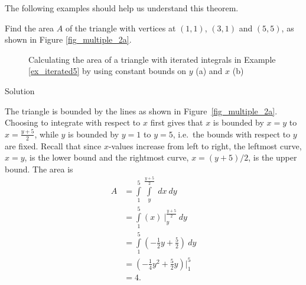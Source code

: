 The following examples should help us understand this theorem.


\begin{example}\label{ex_iterated5}
Find the area $A$ of the triangle with vertices at $(1,1)$, $(3,1)$ and $(5,5)$, as shown in Figure \ref{fig_multiple_2a}.



\begin{figure}[H]
\centering
\qquad
{}
\caption{Calculating the area of a triangle with iterated integrals in Example \ref{ex_iterated5} by using constant bounds on $y$ (a) and $x$ (b) }
\end{figure}




Solution 

The triangle is bounded by the lines as shown in  Figure~\ref{fig_multiple_2a}. Choosing to integrate with respect to $x$ first gives that $x$ is bounded by $x=y$ to $x = \frac{y+5}2$, while $y$ is bounded by $y=1$ to $y=5$, i.e.\ the bounds with respect to $y$ are fixed. Recall that since $x$-values increase from left to right, the leftmost curve, $x=y$, is the lower bound and the rightmost curve, $x=(y+5)/2$, is the upper bound. The area is
\allowdisplaybreaks
\begin{align*}
A &= \int\limits_1^5\int\limits_{y}^{\frac{y+5}2}\ dx\ dy \\
 &= \int\limits_1^5\left(x\right)\ \Big|_y^{\frac{y+5}2}\ dy \\
&= \int\limits_1^5 \left(-\frac12y+\frac52\right)\ dy \\
&= \left(-\frac14y^2+\frac52y\right)\Bigg|_1^5\\
&=4.
\end{align*}


\end{example}
